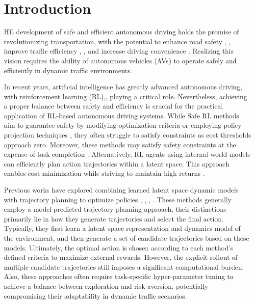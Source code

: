 
\section{Introduction}
\label{sec:introduction}
HE development of safe and efficient autonomous driving holds the promise of revolutionizing transportation, with the potential to enhance road safety \cite{liu2022transfer}, \cite{liu2024studying}, improve traffic efficiency \cite{liu2022exploring}, \cite{liu2024real}, and increase driving convenience \cite{liu2024learning}.
Realizing this vision requires the ability of autonomous vehicles (AVs) to operate safely and efficiently in dynamic traffic environments.

In recent years, artificial intelligence has greatly advanced autonomous driving, with reinforcement learning (RL)\cite{naturego},\cite{vinyals2019grandmaster},\cite{natureatari} playing a critical role. 
Nevertheless, achieving a proper balance between safety and efficiency is crucial for the practical application of RL-based autonomous driving systems.
While Safe RL methods aim to guarantee safety by modifying optimization criteria \cite{zhang2020first} or employing policy projection techniques \cite{Wabersich_2022}, they often struggle to satisfy constraints as cost thresholds approach zero. Moreover, these methods may satisfy safety constraints at the expense of task completion \cite{he2023autocost}. Alternatively, RL agents using internal world models can efficiently plan action trajectories within a latent space. This approach enables cost minimization while striving to maintain high returns \cite{liu2020constrained}. 

Previous works have explored combining learned latent space dynamic models with trajectory planning to optimize policies \cite{MPPI}, \cite{CCEM},  \cite{CCEPETS}, \cite{gao2024spatial}. 
These methods generally employ a model-predicted trajectory planning approach, their distinctions primarily lie in how they generate trajectories and select the final action. Typically, they first learn a latent space representation and dynamics model of the environment, and then generate a set of candidate trajectories based on these models. Ultimately, the optimal action is chosen according to each method's defined criteria to maximize external rewards. However, the explicit rollout of multiple candidate trajectories still imposes a significant computational burden. Also, these approaches often require task-specific hyper-parameter tuning to achieve a balance between exploration and risk aversion, potentially compromising their adaptability in dynamic traffic scenarios.

